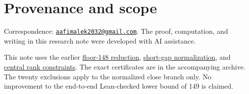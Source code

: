 \documentclass[
  11pt,
]{article}
\begin{document}
\section{Provenance and scope}\label{provenance-and-scope}

Correspondence:
\href{mailto:aafimalek2032@gmail.com}{\nolinkurl{aafimalek2032@gmail.com}}.
The proof, computation, and writing in this research note were developed
with AI assistance.

This note uses the earlier
\href{https://github.com/Aafimalek/novel-discoveries/tree/c582f2587588eeeb195048a74552fe80bdc1d0e7/nine-separated-subset-sums/verification/rank-cuts-below-150/only-floor-148}{floor-148
reduction},
\href{https://github.com/Aafimalek/novel-discoveries/tree/a49d954ffe00669ed70ac7cdd68ef4091263abbc/nine-separated-subset-sums/verification/rank-cuts-below-150/short-gap-normal-form}{short-gap
normalization}, and
\href{https://github.com/Aafimalek/novel-discoveries/tree/63d79a72228169e68bca6f18ec54c97a5147422d/nine-separated-subset-sums/verification/rank-cuts-below-150}{central
rank constraints}. The exact certificates are in the accompanying
archive. The twenty exclusions apply to the normalized close branch
only. No improvement to the end-to-end Lean-checked lower bound of 149
is claimed.
\end{document}

